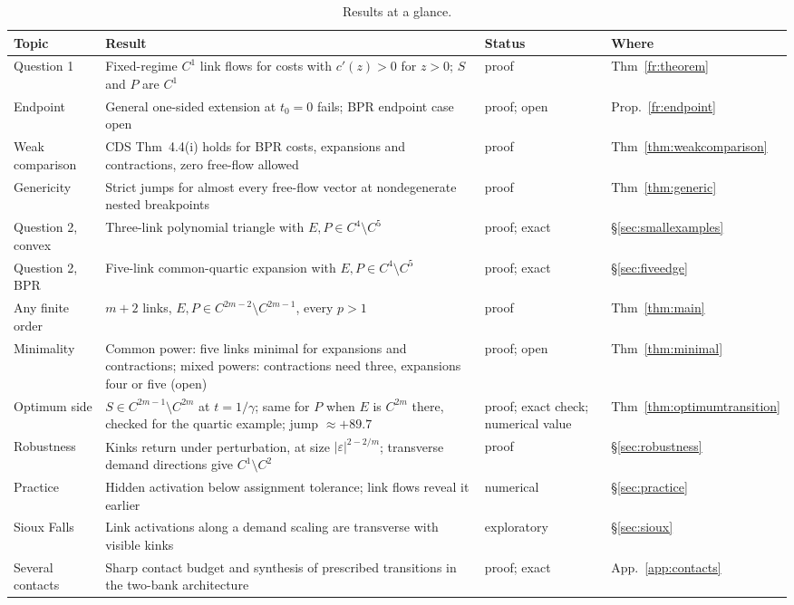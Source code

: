 \begin{table}[htbp]
\centering\small
\begin{tabularx}{\linewidth}{@{}>{\raggedright\arraybackslash}p{3.6cm}>{\raggedright\arraybackslash}X>{\raggedright\arraybackslash}p{2.2cm}l@{}}
\toprule
Topic & Result & Status & Where\\
\midrule
Question 1 & Fixed-regime $C^1$ link flows for costs with $c'(z)>0$ for $z>0$; $S$ and $P$ are $C^1$ & proof & Thm~\ref{fr:theorem}\\
Endpoint & General one-sided extension at $t_0=0$ fails; BPR endpoint case open & proof; open & Prop.~\ref{fr:endpoint}\\
Weak comparison & CDS Thm~4.4(i) holds for BPR costs, expansions and contractions, zero free-flow allowed & proof & Thm~\ref{thm:weakcomparison}\\
Genericity & Strict jumps for almost every free-flow vector at nondegenerate nested breakpoints & proof & Thm~\ref{thm:generic}\\
Question 2, convex & Three-link polynomial triangle with $E,P\in C^4\setminus C^5$ & proof; exact & \S\ref{sec:smallexamples}\\
Question 2, BPR & Five-link common-quartic expansion with $E,P\in C^4\setminus C^5$ & proof; exact & \S\ref{sec:fiveedge}\\
Any finite order & $m+2$ links, $E,P\in C^{2m-2}\setminus C^{2m-1}$, every $p>1$ & proof & Thm~\ref{thm:main}\\
Minimality & Common power: five links minimal for expansions and contractions; mixed powers: contractions need three, expansions four or five (open) & proof; open & Thm~\ref{thm:minimal}\\
Optimum side & $S\in C^{2m-1}\setminus C^{2m}$ at $t=1/\gamma$; same for $P$ when $E$ is $C^{2m}$ there, checked for the quartic example; jump $\approx+89.7$ & proof; exact check; numerical value & Thm~\ref{thm:optimumtransition}\\
Robustness & Kinks return under perturbation, at size $|\varepsilon|^{2-2/m}$; transverse demand directions give $C^1\setminus C^2$ & proof & \S\ref{sec:robustness}\\
Practice & Hidden activation below assignment tolerance; link flows reveal it earlier & numerical & \S\ref{sec:practice}\\
Sioux Falls & Link activations along a demand scaling are transverse with visible kinks & exploratory & \S\ref{sec:sioux}\\
Several contacts & Sharp contact budget and synthesis of prescribed transitions in the two-bank architecture & proof; exact & App.~\ref{app:contacts}\\
\bottomrule
\end{tabularx}
\caption{Results at a glance.}
\label{tab:glance}
\end{table}

